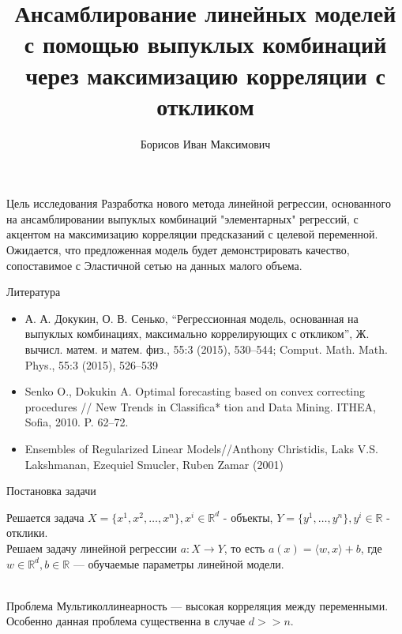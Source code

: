 \documentclass{beamer}
\title[\hbox to]{Ансамблирование линейных моделей с помощью выпуклых комбинаций через максимизацию корреляции с откликом}
\author[И.\,М. Борисов]{Борисов Иван Максимович}
\institute{МГУ}
\date{\footnotesize
\par\smallskip\emph{Научный руководитель:} Сенько Олег Валентинович
\par\bigskip\small 2024}
\begin{document}
\begin{frame}
\thispagestyle{empty}
\maketitle
\end{frame}
\begin{frame}{Цель исследования}
Разработка нового метода линейной регрессии, основанного на ансамблировании выпуклых комбинаций "элементарных" регрессий, с акцентом на максимизацию корреляции предсказаний с целевой переменной. Ожидается, что предложенная модель будет демонстрировать качество, сопоставимое с Эластичной сетью на данных малого объема.
\end{frame}
\begin{frame}{Литература}
\begin{itemize}
    \item А. А. Докукин, О. В. Сенько, “Регрессионная модель, основанная на выпуклых комбинациях, максимально коррелирующих с откликом”, Ж. вычисл. матем. и матем. физ., 55:3 (2015), 530–544; Comput. Math. Math. Phys., 55:3 (2015), 526–539
    \item Senko O., Dokukin A. Optimal forecasting based on convex correcting procedures // New Trends in Classifica* tion and Data Mining. ITHEA, Sofia, 2010. P. 62–72.
    \item Ensembles of Regularized Linear Models//Anthony Christidis, Laks V.S. Lakshmanan, Ezequiel Smucler, Ruben Zamar (2001)
\end{itemize}
\end{frame}
\begin{frame}{Постановка задачи}
    \begin{block}{Решается задача}
    $X = \{x^1, x^2, \dots , x^n\}, x^i \in \mathbb{R}^d$ - объекты, $Y = \{y^1, \dots, y^n\}, y^i \in \mathbb{R}$ - отклики. \\
    Решаем задачу линейной регрессии $a: X \rightarrow Y$, то есть  $a(x) = \langle w, x \rangle + b$, где $w \in \mathbb{R}^d, b \in \mathbb{R}$ — обучаемые параметры линейной модели.\\ \\
    \end{block}
    \begin{block}{Проблема}
    Мультиколлинеарность —  высокая корреляция между переменными. Особенно данная проблема существенна в случае $d >> n$.
    \end{block}
\end{frame}
\end{document}

